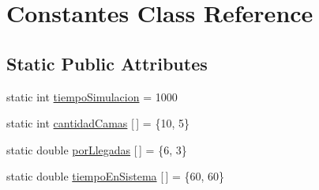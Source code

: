 \hypertarget{class_constantes}{\section{Constantes Class Reference}
\label{class_constantes}
}
\subsection*{Static Public Attributes}
\begin{DoxyCompactItemize}
\item 
static int \hyperlink{class_constantes_a7bef9819ff56fcd18505f64f06fee8ed}{tiempo\-Simulacion} = 1000
\item 
static int \hyperlink{class_constantes_a35a4f31608538e7fb1f8abd5b87a7283}{cantidad\-Camas} \mbox{[}$\,$\mbox{]} = \{10, 5\}
\item 
static double \hyperlink{class_constantes_ad4ce9feb08ed227a1201268871807af9}{por\-Llegadas} \mbox{[}$\,$\mbox{]} = \{6, 3\}
\item 
static double \hyperlink{class_constantes_a164c02deb45777f1aca1dc62882ec3fd}{tiempo\-En\-Sistema} \mbox{[}$\,$\mbox{]} = \{60, 60\}
\end{DoxyCompactItemize}


